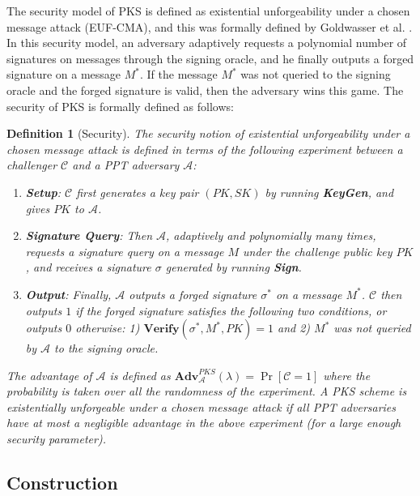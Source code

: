 \documentclass[11pt,letterpaper]{article}
\newtheorem{definition}[theorem]{Definition}
\newcommand{\Adv}{\textbf{Adv}}
\newcommand{\mc}[1]{\mathcal{#1}}
\newcommand{\tb}[1]{\textbf{#1}}
\begin{document}
The security model of PKS is defined as existential unforgeability under a
chosen message attack (EUF-CMA), and this was formally defined by Goldwasser
et al. \cite{GoldwasserMR88}. In this security model, an adversary adaptively
requests a polynomial number of signatures on messages through the signing
oracle, and he finally outputs a forged signature on a message $M^*$. If the
message $M^*$ was not queried to the signing oracle and the forged signature
is valid, then the adversary wins this game. The security of PKS is formally
defined as follows:

\begin{definition}[Security]
The security notion of existential unforgeability under a chosen message
attack is defined in terms of the following experiment between a challenger
$\mc{C}$ and a PPT adversary $\mc{A}$:
\begin{enumerate}
\item \tb{Setup}: $\mc{C}$ first generates a key pair $(PK,SK)$ by running
    \tb{KeyGen}, and gives $PK$ to $\mc{A}$.

\item \tb{Signature Query}: Then $\mc{A}$, adaptively and polynomially
    many times, requests a signature query on a message $M$ under the
    challenge public key $PK$, and receives a signature $\sigma$
    generated by running \tb{Sign}.

\item \tb{Output}: Finally, $\mc{A}$ outputs a forged signature
    $\sigma^*$ on a message $M^*$. $\mc{C}$ then outputs $1$ if the
    forged signature satisfies the following two conditions, or outputs
    $0$ otherwise: 1) $\tb{Verify}(\sigma^*, M^*, PK) = 1$ and 2) $M^*$
    was not queried by $\mc{A}$ to the signing oracle.
\end{enumerate}
The advantage of $\mc{A}$ is defined as $\Adv_{\mc{A}}^{PKS}(\lambda) = \Pr
[\mc{C} = 1]$ where the probability is taken over all the randomness of the
experiment. A PKS scheme is existentially unforgeable under a chosen message
attack if all PPT adversaries have at most a negligible advantage in the
above experiment (for a large enough security parameter).
\end{definition}

\subsection{Construction} \label{sec:pks-prime}
\end{document}
